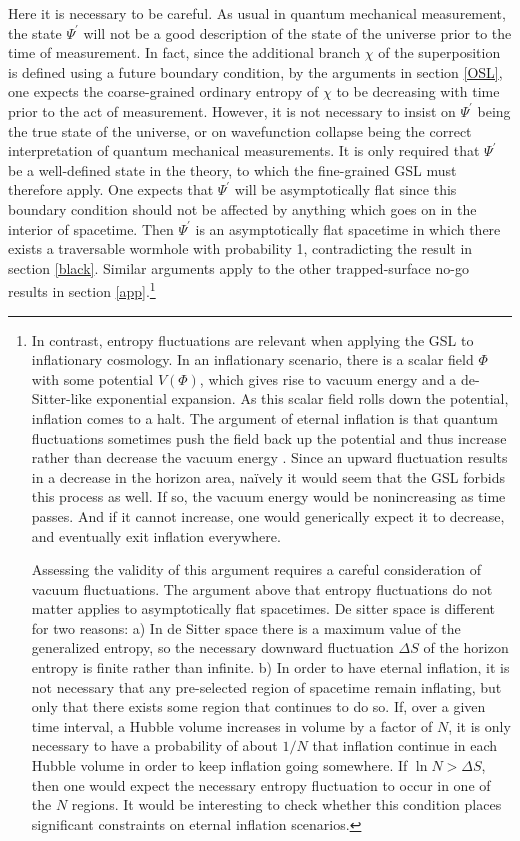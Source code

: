 \documentclass[12pt]{article}
\begin{document}
Here it is necessary to be careful.  As usual in quantum mechanical measurement, the state $\Psi^\prime$ will not be a good description of the state of the universe prior to the time of measurement.  In fact, since the additional branch $\chi$ of the superposition is defined using a future boundary condition, by the arguments in section \ref{OSL}, one expects the coarse-grained ordinary entropy of $\chi$ to be decreasing with time prior to the act of measurement.  However, it is not necessary to insist on $\Psi^\prime$ being the true state of the universe, or on wavefunction collapse being the correct interpretation of quantum mechanical measurements.  It is only required that $\Psi^\prime$ be a well-defined state in the theory, to which the fine-grained GSL must therefore apply.  One expects that $\Psi^\prime$ will be asymptotically flat since this boundary condition should not be affected by anything which goes on in the interior of spacetime.  Then 
$\Psi^\prime$ is an asymptotically flat spacetime in which there exists a traversable wormhole with probability 1, contradicting the result in section \ref{black}.  Similar arguments apply to the other trapped-surface no-go results in section \ref{app}.\footnote{In contrast, entropy fluctuations are relevant when applying the GSL to inflationary cosmology.  In an inflationary scenario, there is a scalar field $\Phi$ with some potential $V(\Phi)$, which gives rise to vacuum energy and a de-Sitter-like exponential expansion.  As this scalar field rolls down the potential, inflation comes to a halt.  The argument of eternal inflation is that quantum fluctuations sometimes push the field back up the potential and thus increase rather than decrease the vacuum energy \cite{eternal}.  Since an upward fluctuation results in a decrease in the horizon area, na\"{i}vely it would seem that the GSL forbids this process as well.  If so, the vacuum energy would be nonincreasing as time passes.  And if it cannot increase, one would generically expect it to decrease, and eventually exit inflation everywhere.

Assessing the validity of this argument requires a careful consideration of vacuum fluctuations.  The argument above that entropy fluctuations do not matter applies to asymptotically flat spacetimes.  De sitter space is different for two reasons: a) In de Sitter space there is a maximum value of the generalized entropy, so the necessary downward fluctuation $\Delta S$ of the horizon entropy is finite rather than infinite. b) In order to have eternal inflation, it is not necessary that any pre-selected region of spacetime remain inflating, but only that there exists some region that continues to do so.  If, over a given time interval, a Hubble volume increases in volume by a factor of $N$, it is only necessary to have a probability of about $1/N$ that inflation continue in each Hubble volume in order to keep inflation going somewhere.  If $\ln N > \Delta S$, then one would expect the necessary entropy fluctuation to occur in one of the $N$ regions.  It would be interesting to check whether this condition places significant constraints on eternal inflation scenarios.\label{inflation}}
\end{document}
